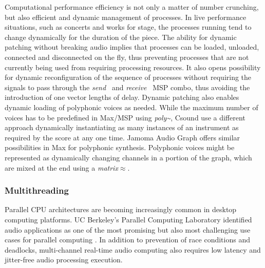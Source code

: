 \documentclass[twoside,a4paper]{article}
\begin{document}
Computational performance efficiency is not only a matter of number crunching, but also efficient and dynamic management of processes.
In live performance situations, such as concerts and works for stage, the processes running tend to change dynamically for the duration of the piece.
The ability for  dynamic patching without breaking audio implies that processes can be loaded, unloaded, connected and disconnected on the fly, thus preventing processes that are not currently being used from requiring processing resources.
It also opens possibility for dynamic reconfiguration of the sequence of processes without requiring the signals to pass through the \emph{send~} and \emph{receive~} MSP combo, thus avoiding the introduction of one vector lengths of delay.
Dynamic patching also enables dynamic loading of polyphonic voices as needed.
While the maximum number of voices has to be predefined in Max/MSP using \emph{poly\textasciitilde}, Csound use a different approach dynamically instantiating as many instances of an instrument as required by the score at any one time.
Jamoma Audio Graph offers similar possibilities in Max for polyphonic synthesis.
Polyphonic voices might be represented as dynamically changing channels in a portion of the graph, which are mixed at the end using a \emph{matrix$\approx$}.





\subsubsection{Multithreading} %

Parallel CPU architectures are becoming increasingly common in desktop computing platforms.
UC Berkeley's Parallel Computing Laboratory identified audio applications as one of the most promising but also most challenging use cases for parallel computing \cite{asanovic2008parallel}. 
In addition to prevention of race conditions and deadlocks, multi-channel real-time audio computing also requires low latency and jitter-free audio processing execution.
\end{document}
